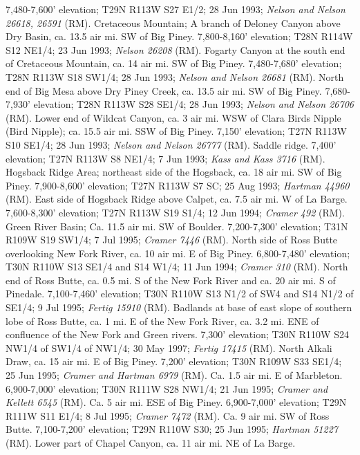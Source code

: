 7,480-7,600’ elevation; T29N R113W S27 E1/2; 28 Jun 1993;
\textit{Nelson and Nelson 26618, 26591} (RM).
Cretaceous Mountain; A branch of Deloney Canyon above Dry Basin, ca. 13.5 air
mi. SW of Big Piney. 7,800-8,160’ elevation; T28N R114W S12 NE1/4; 23 Jun 1993;
\textit{Nelson 26208} (RM).
Fogarty Canyon at the south end of Cretaceous Mountain, ca. 14 air mi. SW of
Big Piney. 7,480-7,680’ elevation; T28N R113W S18 SW1/4; 28 Jun 1993;
\textit{Nelson and Nelson 26681} (RM).
North end of Big Mesa above Dry Piney Creek, ca. 13.5 air mi. SW of Big Piney.
7,680-7,930' elevation; T28N R113W S28	SE1/4; 28 Jun 1993;
\textit{Nelson and Nelson 26706} (RM).
Lower end of Wildcat Canyon, ca. 3 air mi. WSW of Clara Birds Nipple
(Bird Nipple); ca. 15.5 air mi. SSW of Big Piney. 7,150’ elevation;
T27N R113W S10 SE1/4; 28 Jun 1993; \textit{Nelson and Nelson 26777} (RM).
Saddle ridge. 7,400’ elevation; T27N R113W S8 NE1/4; 7 Jun 1993;
\textit{Kass and Kass 3716} (RM).
Hogsback Ridge Area; northeast side of the Hogsback, ca. 18 air mi. SW of
Big Piney. 7,900-8,600’ elevation; T27N R113W S7 SC; 25 Aug 1993;
\textit{Hartman 44960} (RM).
East side of Hogsback Ridge above Calpet, ca. 7.5 air mi. W of La Barge.
7,600-8,300’ elevation; T27N R113W S19 S1/4; 12 Jun 1994;
\textit{Cramer 492} (RM).
Green River Basin; Ca. 11.5 air mi. SW of Boulder. 7,200-7,300’ elevation;
T31N R109W S19 SW1/4; 7 Jul 1995; \textit{Cramer 7446} (RM).
North side of Ross Butte overlooking New Fork River, ca. 10 air mi. E of
Big Piney. 6,800-7,480’ elevation; T30N R110W S13 SE1/4 and S14 W1/4;
11 Jun 1994; \textit{Cramer 310} (RM).
North end of Ross Butte, ca. 0.5 mi. S of the New Fork River and ca. 20 air mi.
S of Pinedale. 7,100-7,460’ elevation; T30N R110W S13 N1/2 of SW4 and S14 N1/2
of SE1/4; 9 Jul 1995; \textit{Fertig 15910} (RM).
Badlands at base of east slope of southern lobe of Ross Butte, ca. 1 mi. E of
the New Fork River, ca. 3.2 mi. ENE of confluence of the New Fork and Green
rivers. 7,300’ elevation; T30N R110W S24 NW1/4 of SW1/4 of NW1/4; 30 May 1997;
\textit{Fertig 17415} (RM).
North Alkali Draw, ca. 15 air mi. E of Big Piney. 7,200’ elevation;
T30N R109W S33 SE1/4; 25 Jun 1995; \textit{Cramer and Hartman 6979} (RM).
Ca. 1.5 air mi. E of Marbleton. 6,900-7,000’ elevation; T30N R111W S28 NW1/4;
21 Jun 1995; \textit{Cramer and Kellett 6545} (RM).
Ca. 5 air mi. ESE of Big Piney. 6,900-7,000’ elevation; T29N R111W S11 E1/4;
8 Jul 1995; \textit{Cramer 7472} (RM).
Ca. 9 air mi. SW of Ross Butte. 7,100-7,200’ elevation; T29N R110W S30;
25 Jun 1995; \textit{Hartman 51227} (RM).
Lower part of Chapel Canyon, ca. 11 air mi. NE of La Barge.
